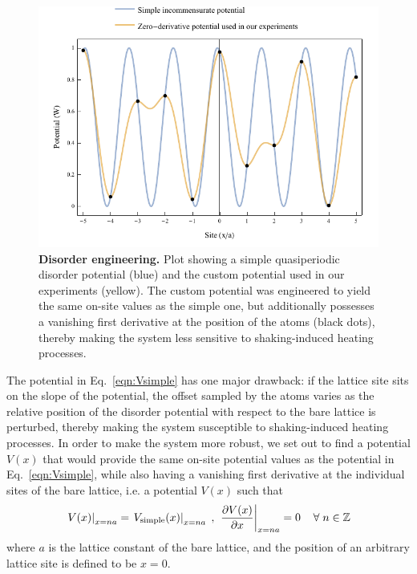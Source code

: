 \begin{figure}[t]
	\centering
	\includegraphics{figures/MBL_disorder.pdf}
	\caption{\label{fig:MBL_disorder} \textbf{Disorder engineering.} Plot showing a simple quasiperiodic disorder potential (blue) and the custom potential used in our experiments (yellow). The custom potential was engineered to yield the same on-site values as the simple one, but additionally possesses a vanishing first derivative at the position of the atoms (black dots), thereby making the system less sensitive to shaking-induced heating processes.}
\end{figure}


The potential in Eq.~\ref{eqn:Vsimple} has one major drawback: if the lattice site sits on the slope of the potential, the offset sampled by the atoms varies as the relative position of the disorder potential with respect to the bare lattice is perturbed, thereby making the system susceptible to shaking-induced heating processes. In order to make the system more robust, we set out to find a potential $V(x)$ that would provide the same on-site potential values as the potential in Eq.~\ref{eqn:Vsimple}, while also having a vanishing first derivative at the individual sites of the bare lattice, i.e. a potential $V(x)$ such that
$$ \left.V(x)\right\vert_{x = na} = \left.V_\text{simple}(x)\right\vert_{x = na} \hspace{1mm} , \hspace{1mm} \left. \frac{\partial V(x)}{\partial x} \right\vert_{x = na} = 0 \hspace{4mm} \forall \hspace{1mm} n \in \mathbb{Z} $$
where $a$ is the lattice constant of the bare lattice, and the position of an arbitrary lattice site is defined to be $x=0$. 

